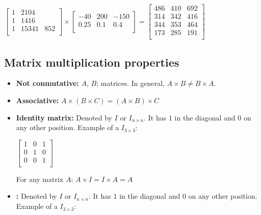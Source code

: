 \documentclass[a4paper]{report}
\begin{document}
          $\begin{bmatrix}
            1 & 2104 \\
            1 & 1416 \\
            1 & 1534
            1 & 852 \\
          \end{bmatrix}
          \times
          \begin{bmatrix}
            -40 & 200 & -150 \\
            0.25 & 0.1 & 0.4 \\
          \end{bmatrix}
          =
          \begin{bmatrix}
            486 & 410 & 692 \\
            314 & 342 & 416 \\
            344 & 353 & 464 \\
            173 & 285 & 191 \\
          \end{bmatrix}$


      \subsection{Matrix multiplication properties}

        \begin{itemize}
          \item \textbf{Not conmutative:} $A$, $B$; matrices. In general, $A \times B \neq B \times A$.
          \item \textbf{Associative:} $A \times (B \times C) = (A \times B) \times C$
          \item \textbf{Identity matrix:} Denoted by $I$ or $I_{n \times n}$. It has $1$ in the diagonal and $0$ on any other position. Example of a $I_{3 \times 3}$:

            $\begin{bmatrix}
              1 & 0 & 1 \\
              0 & 1 & 0 \\
              0 & 0 & 1 \\
            \end{bmatrix}$

            For any matrix $A$: $A \times I = I \times A = A$

          \item \textbf{:} Denoted by $I$ or $I_{n \times n}$. It has $1$ in the diagonal and $0$ on any other position. Example of a $I_{3 \times 3}$:

        \end{itemize}
\end{document}
